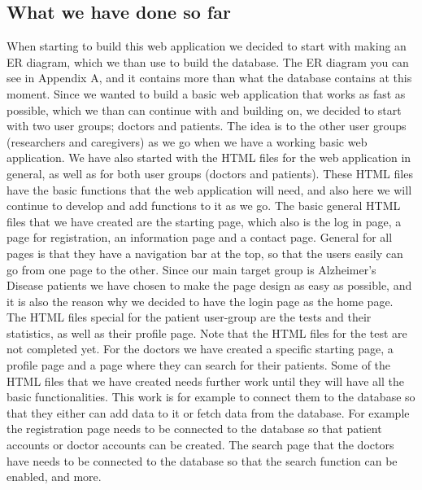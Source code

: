 \documentclass{article}
\begin{document}
\subsection{What we have done so far}
When starting to build this web application we decided to start with making an ER diagram, which we than use to build the database. The ER diagram you can see in Appendix A, and it contains more than what the database contains at this moment. Since we wanted to build a basic web application that works as fast as possible, which we than can continue with and building on, we decided to start with two user groups; doctors and patients. The idea is to the other user groups (researchers and caregivers) as we go when we have a working basic web application. \newline
\newline We have also started with the HTML files for the web application in general, as well as for both user groups (doctors and patients). These HTML files have the basic functions that the web application will need, and also here we will continue to develop and add functions to it as we go. The basic general HTML files that we have created are the starting page, which also is the log in page, a page for registration, an information page and a contact page. General for all pages is that they have a navigation bar at the top, so that the users easily can go from one page to the other. Since our main target group is Alzheimer's Disease patients we have chosen to make the page design as easy as possible, and it is also the reason why we decided to have the login page as the home page. The HTML files special for the patient user-group are the tests and their statistics, as well as their profile page. Note that the HTML files for the test are not completed yet. For the doctors we have created a specific starting page, a profile page and a page where they can search for their patients.\newline
\newline Some of the HTML files that we have created needs further work until they will have all the basic functionalities. This work is for example to connect them to the database so that they either can add data to it or fetch data from the database. For example the registration page needs to be connected to the database so that patient accounts or doctor accounts can be created. The search page that the doctors have needs to be connected to the database so that the search function can be enabled, and more.
\end{document}
